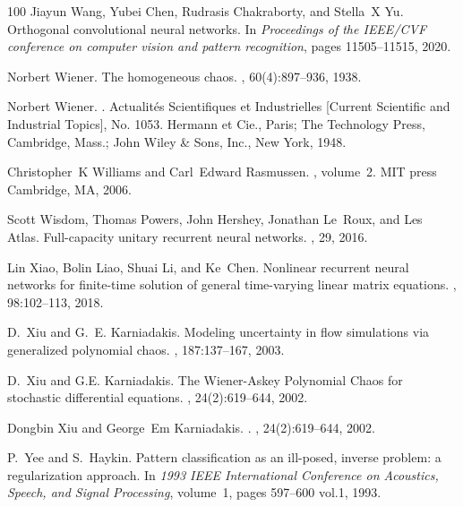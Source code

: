 \documentclass[a4paper,fleqn]{article}
\begin{document}
\begin{thebibliography}{100}
Jiayun Wang, Yubei Chen, Rudrasis Chakraborty, and Stella~X Yu.
\newblock Orthogonal convolutional neural networks.
\newblock In {\em Proceedings of the IEEE/CVF conference on computer vision and
  pattern recognition}, pages 11505--11515, 2020.

Norbert Wiener.
\newblock The homogeneous chaos.
, 60(4):897--936, 1938.

Norbert Wiener.
.
\newblock Actualit\'{e}s Scientifiques et Industrielles [Current Scientific and
  Industrial Topics], No. 1053. Hermann et Cie., Paris; The Technology Press,
  Cambridge, Mass.; John Wiley \& Sons, Inc., New York, 1948.

Christopher~K Williams and Carl~Edward Rasmussen.
, volume~2.
\newblock MIT press Cambridge, MA, 2006.

Scott Wisdom, Thomas Powers, John Hershey, Jonathan Le~Roux, and Les Atlas.
\newblock Full-capacity unitary recurrent neural networks.
, 29, 2016.

Lin Xiao, Bolin Liao, Shuai Li, and Ke~Chen.
\newblock Nonlinear recurrent neural networks for finite-time solution of
  general time-varying linear matrix equations.
, 98:102--113, 2018.

D.~Xiu and G.~E. Karniadakis.
\newblock Modeling uncertainty in flow simulations via generalized polynomial
  chaos.
, 187:137--167, 2003.

D.~Xiu and G.E. Karniadakis.
\newblock The {W}iener-{A}skey {P}olynomial {C}haos for stochastic differential
  equations.
, 24(2):619--644, 2002.

Dongbin Xiu and George~Em Karniadakis.
.
, 24(2):619--644, 2002.

P.~Yee and S.~Haykin.
\newblock Pattern classification as an ill-posed, inverse problem: a
  regularization approach.
\newblock In {\em 1993 IEEE International Conference on Acoustics, Speech, and
  Signal Processing}, volume~1, pages 597--600 vol.1, 1993.


\end{thebibliography}
\end{document}
